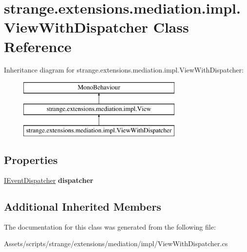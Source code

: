 \hypertarget{classstrange_1_1extensions_1_1mediation_1_1impl_1_1_view_with_dispatcher}{\section{strange.\-extensions.\-mediation.\-impl.\-View\-With\-Dispatcher Class Reference}
\label{classstrange_1_1extensions_1_1mediation_1_1impl_1_1_view_with_dispatcher}
}
Inheritance diagram for strange.\-extensions.\-mediation.\-impl.\-View\-With\-Dispatcher\-:\begin{figure}[H]
\begin{center}
\leavevmode
\includegraphics[height=3.000000cm]{classstrange_1_1extensions_1_1mediation_1_1impl_1_1_view_with_dispatcher}
\end{center}
\end{figure}
\subsection*{Properties}
\begin{DoxyCompactItemize}
\item 
\hypertarget{classstrange_1_1extensions_1_1mediation_1_1impl_1_1_view_with_dispatcher_a1c3bfdd5cd3071e911e93c4975635a6a}{\hyperlink{interfacestrange_1_1extensions_1_1dispatcher_1_1eventdispatcher_1_1api_1_1_i_event_dispatcher}{I\-Event\-Dispatcher} {\bfseries dispatcher}}\label{classstrange_1_1extensions_1_1mediation_1_1impl_1_1_view_with_dispatcher_a1c3bfdd5cd3071e911e93c4975635a6a}

\end{DoxyCompactItemize}
\subsection*{Additional Inherited Members}


The documentation for this class was generated from the following file\-:\begin{DoxyCompactItemize}
\item 
Assets/scripts/strange/extensions/mediation/impl/View\-With\-Dispatcher.\-cs\end{DoxyCompactItemize}
